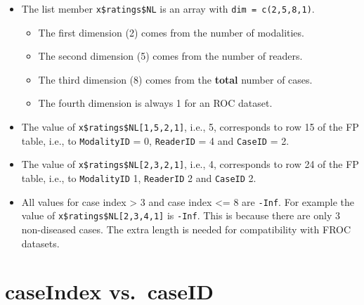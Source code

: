 \documentclass[
]{book}
\providecommand{\tightlist}{%
  \setlength{\itemsep}{0pt}\setlength{\parskip}{0pt}}
\begin{document}
\begin{itemize}
\tightlist
\item
  The list member \texttt{x\$ratings\$NL} is an array with \texttt{dim\ =\ c(2,5,8,1)}.

  \begin{itemize}
  \tightlist
  \item
    The first dimension (2) comes from the number of modalities.
  \item
    The second dimension (5) comes from the number of readers.
  \item
    The third dimension (8) comes from the \textbf{total} number of cases.
  \item
    The fourth dimension is always 1 for an ROC dataset.
  \end{itemize}
\item
  The value of \texttt{x\$ratings\$NL{[}1,5,2,1{]}}, i.e., 5, corresponds to row 15 of the FP table, i.e., to \texttt{ModalityID} = 0, \texttt{ReaderID} = 4 and \texttt{CaseID} = 2.
\item
  The value of \texttt{x\$ratings\$NL{[}2,3,2,1{]}}, i.e., 4, corresponds to row 24 of the FP table, i.e., to \texttt{ModalityID} 1, \texttt{ReaderID} 2 and \texttt{CaseID} 2.
\item
  All values for case index \textgreater{} 3 and case index \textless= 8 are \texttt{-Inf}. For example the value of \texttt{x\$ratings\$NL{[}2,3,4,1{]}} is \texttt{-Inf}. This is because there are only 3 non-diseased cases. The extra length is needed for compatibility with FROC datasets.
\end{itemize}

\hypertarget{quick-start-read-datafile-correspondence-case-index-vs-case-id}{%
\section{caseIndex vs.~caseID}\label{quick-start-read-datafile-correspondence-case-index-vs-case-id}}
\end{document}
